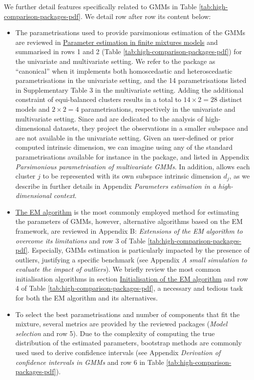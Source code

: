 We further detail features specifically related to GMMs in Table
\ref{tab:high-comparison-packages-pdf}. We detail row after row its content below:

\begin{itemize}
\item
  The parametrisations used to provide parsimonious estimation of the GMMs are reviewed in \protect\hyperlink{parameter-estimation-in-finite-mixtures-models}{Parameter estimation in finite mixtures models} and summarised in rows 1 and 2 (Table \ref{tab:high-comparison-packages-pdf}) for the univariate and multivariate setting. We refer to the package as ``canonical'' when it implements both homoscedastic and heteroscedastic parametrisations in the univariate setting, and the 14 parametrisations listed in Supplementary Table 3 in the multivariate setting. Adding the additional constraint of equi-balanced clusters results in a total to \(14 \times 2=28\) distinct models and \(2 \times 2=4\) parametrisations, respectively in the univariate and multivariate setting. Since  and  are dedicated to the analysis of high-dimensional datasets, they project the observations in a smaller subspace and are not available in the univariate setting. Given an user-defined or prior computed intrinsic dimension, we can imagine using any of the standard parametrisations available for instance in the  package, and listed in Appendix \emph{Parsimonious parametrisation of multivariate GMMs}. In addition,  allows each cluster \(j\) to be represented with its own subspace intrinsic dimension \(d_j\), as we describe in further details in Appendix \emph{Parameters estimation in a high-dimensional context}.
\item
  \protect\hyperlink{the-em-algorithm}{The EM algorithm} is the most commonly employed method for estimating the parameters of GMMs, however, alternative algorithms based on the EM framework, are reviewed in Appendix B: \emph{Extensions of the EM algorithm to overcome its limitations} and row 3 of Table \ref{tab:high-comparison-packages-pdf}. Especially, GMMs estimation is particularly impacted by the presence of outliers, justifying a specific benchmark (see Appendix \emph{A small simulation to evaluate the impact of outliers}).
  We briefly review the most common initialisation algorithms in section \protect\hyperlink{initialisation-of-the-em-algorithm}{Initialisation of the EM algorithm} and row 4 of Table \ref{tab:high-comparison-packages-pdf}, a necessary and tedious task for both the EM algorithm and its alternatives.
\item
  To select the best parametrisations and number of components that fit the mixture, several metrics are provided by the reviewed packages (\emph{Model selection} and row 5). Due to the complexity of computing the true distribution of the estimated parameters, bootstrap methods are commonly used used to derive confidence intervals (see Appendix \emph{Derivation of confidence intervals in GMMs} and row 6 in Table \ref{tab:high-comparison-packages-pdf}).
\end{itemize}

